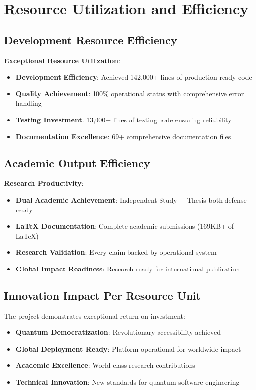 \documentclass[12pt,a4paper]{article}
\begin{document}
\section{Resource Utilization and Efficiency}

\subsection{Development Resource Efficiency}

\textbf{Exceptional Resource Utilization}:
\begin{itemize}
    \item \textbf{Development Efficiency}: Achieved 142{,}000+ lines of production-ready code
    \item \textbf{Quality Achievement}: 100\% operational status with comprehensive error handling
    \item \textbf{Testing Investment}: 13{,}000+ lines of testing code ensuring reliability
    \item \textbf{Documentation Excellence}: 69+ comprehensive documentation files
\end{itemize}

\subsection{Academic Output Efficiency}

\textbf{Research Productivity}:
\begin{itemize}
    \item \textbf{Dual Academic Achievement}: Independent Study + Thesis both defense-ready
    \item \textbf{LaTeX Documentation}: Complete academic submissions (169KB+ of LaTeX)
    \item \textbf{Research Validation}: Every claim backed by operational system
    \item \textbf{Global Impact Readiness}: Research ready for international publication
\end{itemize}

\subsection{Innovation Impact Per Resource Unit}

The project demonstrates exceptional return on investment:
\begin{itemize}
    \item \textbf{Quantum Democratization}: Revolutionary accessibility achieved
    \item \textbf{Global Deployment Ready}: Platform operational for worldwide impact
    \item \textbf{Academic Excellence}: World-class research contributions
    \item \textbf{Technical Innovation}: New standards for quantum software engineering
\end{itemize}
\end{document}
